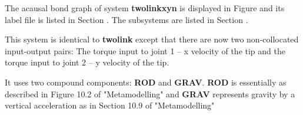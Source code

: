 
%

   The acausal bond graph of system \textbf{twolinkxyn} is
   displayed in Figure  and its label
   file is listed in Section .
   The subsystems are listed in Section .

This system is identical to  \textbf{twolink} except that there are
now two non-collocated input-output pairs: The torque input to joint 1
-- x velocity of the tip and the torque input to joint 2
-- y velocity of the tip. 

It uses two compound components: {\bf ROD} and {\bf GRAV}.  {\bf ROD}
is essentially as described in Figure 10.2 of "Metamodelling" and {\bf
GRAV} represents gravity by a vertical acceleration as in Section
10.9 of "Metamodelling"


